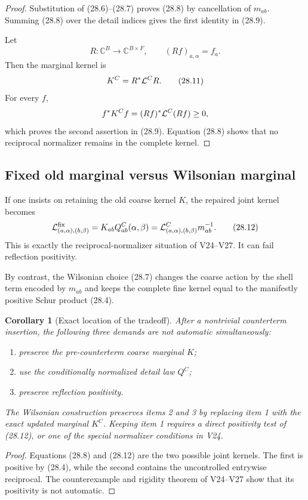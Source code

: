 \documentclass[11pt]{article}
\newtheorem{corollary}[theorem]{Corollary}
\theoremstyle{remark}
\begin{document}
\begin{proof}
Substitution of (28.6)--(28.7) proves (28.8) by cancellation of
\(m_{ab}\).  Summing (28.8) over the detail indices gives the first
identity in (28.9).

Let
\[
 R:\mathbb C^B\longrightarrow\mathbb C^{B\times F},
 \qquad
 (Rf)_{a,\alpha}=f_a.                                      \tag{28.10}
\]
Then the marginal kernel is
\[
                         K^C=R^*{\cal L}^CR.                \tag{28.11}
\]
For every \(f\),
\[
 f^*K^Cf=(Rf)^*{\cal L}^C(Rf)\ge0,
\]
which proves the second assertion in (28.9).  Equation (28.8) shows
that no reciprocal normalizer remains in the complete kernel.
\end{proof}

\subsection{Fixed old marginal versus Wilsonian marginal}

If one insists on retaining the old coarse kernel \(K\), the repaired
joint kernel becomes
\[
 {\cal L}^{\rm fix}_{(a,\alpha),(b,\beta)}
 =
 K_{ab}Q^C_{ab}(\alpha,\beta)
 =
 {\cal L}^C_{(a,\alpha),(b,\beta)}m_{ab}^{-1}.              \tag{28.12}
\]
This is exactly the reciprocal-normalizer situation of V24--V27.
It can fail reflection positivity.

By contrast, the Wilsonian choice (28.7) changes the coarse action by
the shell term encoded by \(m_{ab}\) and keeps the complete fine
kernel equal to the manifestly positive Schur product (28.4).

\begin{corollary}[Exact location of the tradeoff]
\label{cor:v12v28-tradeoff}
After a nontrivial counterterm insertion, the following three demands
are not automatic simultaneously:
\begin{enumerate}
\item preserve the pre-counterterm coarse marginal \(K\);
\item use the conditionally normalized detail law \(Q^C\);
\item preserve reflection positivity.
\end{enumerate}
The Wilsonian construction preserves items 2 and 3 by replacing item
1 with the exact updated marginal \(K^C\).  Keeping item 1 requires a
direct positivity test of (28.12), or one of the special
normalizer conditions in V24.
\end{corollary}

\begin{proof}
Equations (28.8) and (28.12) are the two possible joint kernels.
The first is positive by (28.4), while the second contains the
uncontrolled entrywise reciprocal.  The counterexample and rigidity
theorem of V24--V27 show that its positivity is not automatic.
\end{proof}
\end{document}

